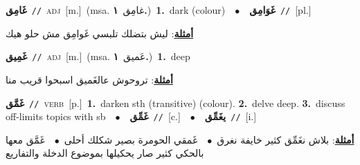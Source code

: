 \documentclass[10pt,a4paper,twoside]{article} %
\begin{document}
\begin{multicols}{2}
{\setlength\topsep{0pt}\textbf{\foreignlanguage{arabic}{غَامِق}}\ {\color{gray}\texttt{//}\color{black}}\ \textsc{adj}\ [m.]\ \color{gray}(msa. \foreignlanguage{arabic}{غامِق}~\foreignlanguage{arabic}{\textbf{١.}})\color{black}\ \textbf{1.}~dark (colour)\ \ $\bullet$\ \ \setlength\topsep{0pt}\textbf{\foreignlanguage{arabic}{غَوَامِق}}\ {\color{gray}\texttt{//}\color{black}}\ [pl.]\  \begin{flushright}\color{gray}\foreignlanguage{arabic}{\textbf{\underline{\foreignlanguage{arabic}{أمثلة}}}: ليش بتضلك تلبسي غَوامِق مش حلو هيك}\end{flushright}\color{black}} \vspace{2mm}

{\setlength\topsep{0pt}\textbf{\foreignlanguage{arabic}{غَمِيق}}\ {\color{gray}\texttt{//}\color{black}}\ \textsc{adj}\ [m.]\ \color{gray}(msa. \foreignlanguage{arabic}{عَميق}~\foreignlanguage{arabic}{\textbf{١.}})\color{black}\ \textbf{1.}~deep\  \begin{flushright}\color{gray}\foreignlanguage{arabic}{\textbf{\underline{\foreignlanguage{arabic}{أمثلة}}}: تروحوش عالغَميق اسبحوا قريب منا}\end{flushright}\color{black}} \vspace{2mm}

{\setlength\topsep{0pt}\textbf{\foreignlanguage{arabic}{غَمَّق}}\ {\color{gray}\texttt{//}\color{black}}\ \textsc{verb}\ [p.]\ \textbf{1.}~darken sth (transitive) (colour).  \textbf{2.}~delve deep.  \textbf{3.}~discuss off-limits topics with sb\ \ $\bullet$\ \ \setlength\topsep{0pt}\textbf{\foreignlanguage{arabic}{غَمِّق}}\ {\color{gray}\texttt{//}\color{black}}\ [c.]\ \ $\bullet$\ \ \setlength\topsep{0pt}\textbf{\foreignlanguage{arabic}{يغَمِّق}}\ {\color{gray}\texttt{//}\color{black}}\ [i.]\  \begin{flushright}\color{gray}\foreignlanguage{arabic}{\textbf{\underline{\foreignlanguage{arabic}{أمثلة}}}: بلاش نغَمِّق كثير خايفة نغرق\ $\bullet$\ \  غَمقي الحومرة بصير شكلك أحلى\ $\bullet$\ \  غَمَّق معها بالحكي كثير صار يحكيلها بموضوع الدخلة والتفاريع}\end{flushright}\color{black}} \vspace{2mm}


\end{multicols}
\end{document}
